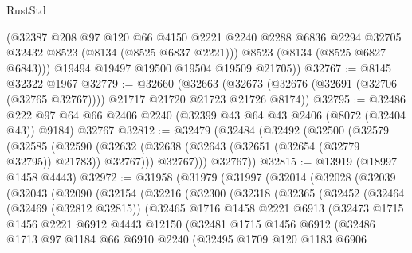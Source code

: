 \begin{lexlean}{RustStd}
\begin{coremodule}
          (@32387
            @208
            @97
            @120
            @66
            @4150
            @2221
            @2240
            @2288
            @6836
            @2294
            @32705
            @32432
            @8523
            (@8134 (@8525 @6837 @2221)))
          @8523
          (@8134 (@8525 @6827 @6843)))
        @19494
        @19497
        @19500
        @19504
        @19509
        @21705))
@32767 := @8145 @32322 @1967
@32779 := @32660
    (@32663 (@32673 (@32676 (@32691 (@32706 (@32765 @32767)))) @21717 @21720 @21723 @21726 @8174))
@32795 := @32486
    @222
    @97
    @64
    @66
    @2406
    @2240
    (@32399 @43 @64 @43 @2406 (@8072 (@32404 @43)) @9184)
    @32767
@32812 := @32479
    (@32484
      (@32492
        (@32500
          (@32579
            (@32585
              (@32590 (@32632 (@32638 (@32643 (@32651 (@32654 (@32779 @32795)) @21783)) @32767)))
              @32767)))
        @32767))
@32815 := @13919 (@18997 @1458 @4443)
@32972 := @31958
    (@31979
      (@31997
        (@32014
          (@32028
            (@32039
              (@32043
                (@32090
                  (@32154
                    (@32216
                      (@32300
                        (@32318
                          (@32365
                            (@32452
                              (@32464
                                (@32469 (@32812 @32815))
                                (@32465
                                  @1716
                                  @1458
                                  @2221
                                  @6913
                                  (@32473
                                    @1715
                                    @1456
                                    @2221
                                    @6912
                                    @4443
                                    @12150
                                    (@32481
                                      @1715
                                      @1456
                                      @6912
                                      (@32486
                                        @1713
                                        @97
                                        @1184
                                        @66
                                        @6910
                                        @2240
                                        (@32495
                                          @1709
                                          @120
                                          @1183
                                          @6906

\end{coremodule}
\end{lexlean}
